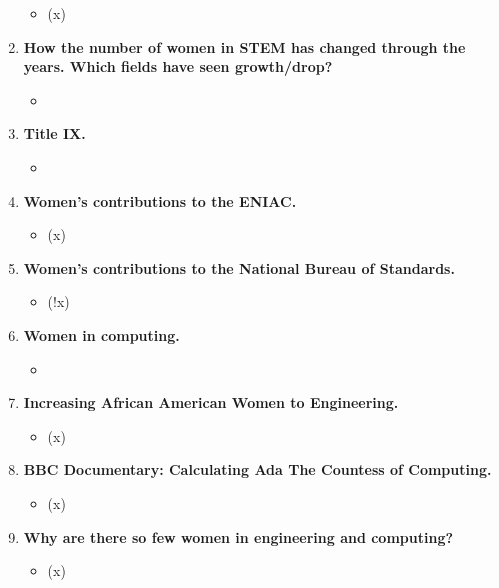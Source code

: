 \documentclass[12pt,a4paper]{article}
\begin{document}
\begin{enumerate}
\begin{itemize}
      \item[] (x) %
    \end{itemize}
    \item \textbf{How the number of women in STEM has changed through the years. Which fields have seen growth/drop?}
    \begin{itemize}
      \item[] 
    \end{itemize}
    \item \textbf{Title IX.}
    \begin{itemize}
      \item[] 
    \end{itemize}
    \item \textbf{Women's contributions to the ENIAC.}
    \begin{itemize}
      \item[] (x) %
    \end{itemize}
    \item \textbf{Women's contributions to the National Bureau of Standards.}
    \begin{itemize}
      \item[] (!x) %
    \end{itemize}
    \item \textbf{Women in computing.}
    \begin{itemize}
      \item[] 
    \end{itemize}
    \item \textbf{Increasing African American Women to Engineering.}
    \begin{itemize}
      \item[] (x) %
    \end{itemize}
    \item \textbf{BBC Documentary: Calculating Ada The Countess of Computing.}
    \begin{itemize}
      \item[] (x) %
    \end{itemize}
    \item \textbf{Why are there so few women in engineering and computing?}
    \begin{itemize}
      \item[] (x) %
    \end{itemize}
  \end{enumerate}
  
\end{document}

